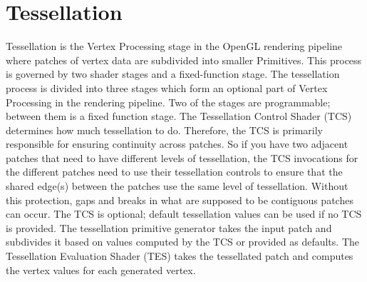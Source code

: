 \documentclass{report}
\begin{document}
\section{Tessellation}

Tessellation is the Vertex
Processing stage in the OpenGL rendering pipeline where patches of vertex data are subdivided into
smaller Primitives. This process is governed by two shader stages and a fixed-function stage.
The tessellation process is divided into three stages which form an optional part of Vertex
Processing in the rendering pipeline. Two of the stages are programmable; between them is a fixed 
function stage. The Tessellation Control Shader (TCS) determines how much tessellation to do.
Therefore, the TCS is primarily responsible for ensuring continuity across patches.
So if you have two adjacent patches that need to have different levels of tessellation, the TCS 
invocations for the different patches need to use their tessellation controls to ensure that the 
shared edge(s) between the patches use the same level of tessellation. Without this protection, 
gaps and breaks in what are supposed to be contiguous patches can occur.
The TCS is optional; default tessellation values can be used if no TCS is provided.
The tessellation primitive generator takes the input patch and subdivides it based on values
computed by the TCS or provided as defaults.
The Tessellation Evaluation Shader (TES) takes the tessellated patch and computes the vertex 
values for each generated vertex. 
\end{document}
